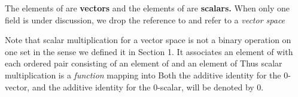 \documentclass[11pt,oneside]{article}
\begin{document}
\begin{BookBody}




\noindent The elements of  are\textbf{ vectors} and the elements of  are\textbf{ scalars.} When only one field  is under discussion, we drop the reference to  and refer to a\textit{ vector space}\BookEnd{\blacksquare}

Note that scalar multiplication for a vector space is not a binary operation on one set in the sense we defined it in Section 1. It associates an element  of  with each 
ordered pair  consisting of an element  of  and an element \BookInline{\alpha } of  Thus scalar multiplication is a\textit{ function} mapping  into  Both the additive identity for  the 0-vector, and the additive identity for  the 0-scalar, will be denoted by 0.

\end{BookBody}

\BookNarrativetrue
\end{document}
